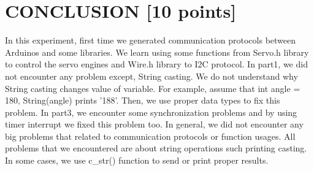 \documentclass[pdftex,12pt,a4paper]{article}
\begin{document}
\section{CONCLUSION [10 points]}
In this experiment, first time we generated communication protocols between Arduinos and some libraries. We learn using some functions from Servo.h library to control the servo engines and Wire.h library to I2C protocol. In part1, we did not encounter any problem except, String casting. We do not understand why String casting changes value of variable. For example, assume that int angle = 180, String(angle) prints '188'. Then, we use proper data types to fix this problem. In part3, we encounter some synchronization problems and by using timer interrupt we fixed this problem too. In general, we did not encounter any big problems that related to communication protocols or function usages. All problems that we encountered are about string operations such printing casting. In some cases, we use c\_str() function to send or print proper results.
\newpage
{}



\end{document}
